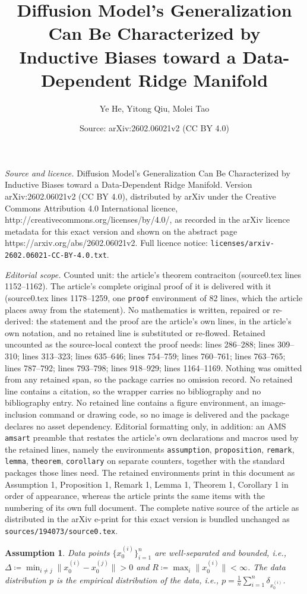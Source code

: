 \documentclass[10pt,a4paper]{amsart}
\title{Diffusion Model's Generalization Can Be Characterized by \\ Inductive Biases toward a Data-Dependent Ridge Manifold}
\author{Ye He, Yitong Qiu, Molei Tao}
\date{Source: arXiv:2602.06021v2 (CC BY 4.0)}
\newtheorem{assumption}{Assumption}
\begin{document}
\maketitle

\noindent\emph{Source and licence.} Diffusion Model's Generalization Can Be Characterized by \\ Inductive Biases toward a Data-Dependent Ridge Manifold. Version arXiv:2602.06021v2 (CC BY 4.0), distributed by arXiv under the Creative Commons Attribution 4.0 International licence, http://creativecommons.org/licenses/by/4.0/, as recorded in the arXiv licence metadata for this exact version and shown on the abstract page https://arxiv.org/abs/2602.06021v2. Full licence notice: \texttt{licenses/arxiv-2602.06021-CC-BY-4.0.txt}.\par\smallskip

\noindent\textit{Editorial scope.} Counted unit: the article's theorem contraciton (source0.tex lines 1152--1162). The article's complete original proof of it is delivered with it (source0.tex lines 1178--1259, one \texttt{proof} environment of 82 lines, which the article places away from the statement). No mathematics is written, repaired or re-derived: the statement and the proof are the article's own lines, in the article's own notation, and no retained line is substituted or re-flowed.  Retained uncounted as the source-local context the proof needs: lines 286--288; lines 309--310; lines 313--323; lines 635--646; lines 754--759; lines 760--761; lines 763--765; lines 787--792; lines 793--798; lines 918--929; lines 1164--1169.  Nothing was omitted from any retained span, so the package carries no omission record.  No retained line contains a citation, so the wrapper carries no bibliography and no bibliography entry.  No retained line contains a figure environment, an image-inclusion command or drawing code, so no image is delivered and the package declares no asset dependency.  Editorial formatting only, in addition: an AMS \texttt{amsart} preamble that restates the article's own declarations and macros used by the retained lines, namely the environments \texttt{assumption}, \texttt{proposition}, \texttt{remark}, \texttt{lemma}, \texttt{theorem}, \texttt{corollary} on separate counters, together with the standard packages those lines need.  The retained environments print in this document as Assumption 1, Proposition 1, Remark 1, Lemma 1, Theorem 1, Corollary 1 in order of appearance, whereas the article prints the same items with the numbering of its own full document.  The complete native source of the article as distributed in the arXiv e-print for this exact version is bundled unchanged as \texttt{sources/194073/source0.tex}.
\begin{assumption}\label{assump:data} Data points $\{x_0^{(i)}\}_{i=1}^n$ are well-separated and bounded, i.e., $\Delta\coloneqq \min_{i\neq j} \| x_0^{(i)}-x_0^{(j)} \|>0$ and $R \coloneqq \max_i \| x_0^{(i)} \|<\infty$.
The data distribution $p$ is the \emph{empirical} distribution of the data, i.e., $p= \tfrac{1}{n}\sum_{i=1}^n \delta_{x_0^{(i)}}$. 
\end{assumption}
\end{document}
